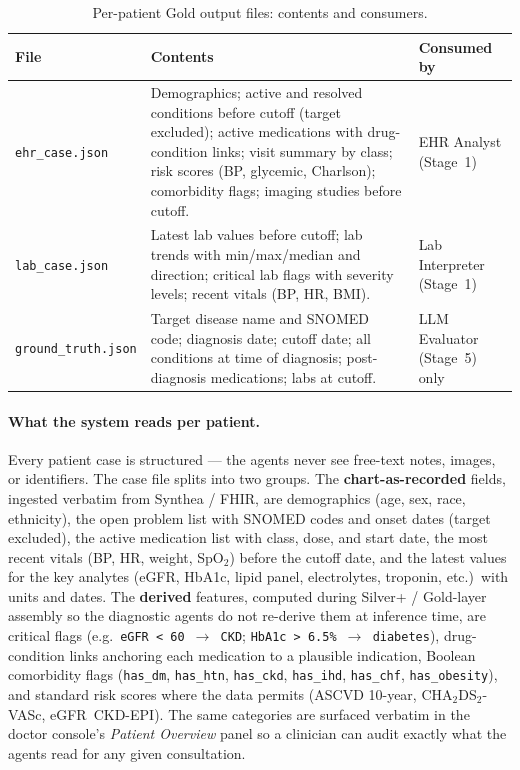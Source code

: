 \begin{table}[!htbp]
\centering
\caption{Per-patient Gold output files: contents and consumers.}
\label{tab:gold_files}
\footnotesize
\begin{tabular}{@{}p{32mm}p{72mm}p{32mm}@{}}
\toprule
\textbf{File} & \textbf{Contents} & \textbf{Consumed by} \\
\midrule
\texttt{ehr\_case.json} &
Demographics; active and resolved conditions before cutoff (target
excluded); active medications with drug-condition links; visit
summary by class; risk scores (BP, glycemic, Charlson); comorbidity
flags; imaging studies before cutoff. &
EHR Analyst (Stage~1) \\

\texttt{lab\_case.json} &
Latest lab values before cutoff; lab trends with min/max/median and
direction; critical lab flags with severity levels; recent vitals
(BP, HR, BMI). &
Lab Interpreter (Stage~1) \\

\texttt{ground\_truth.json} &
Target disease name and SNOMED code; diagnosis date; cutoff date;
all conditions at time of diagnosis; post-diagnosis medications;
labs at cutoff. &
LLM Evaluator (Stage~5) only \\
\bottomrule
\end{tabular}
\end{table}

\FloatBarrier

\paragraph{What the system reads per patient.}
Every patient case is structured --- the agents never see free-text
notes, images, or identifiers. The case file splits into two groups.
The \textbf{chart-as-recorded} fields, ingested verbatim from Synthea
/ FHIR, are demographics (age, sex, race, ethnicity), the open problem
list with SNOMED codes and onset dates (target excluded), the active
medication list with class, dose, and start date, the most recent
vitals (BP, HR, weight, SpO$_2$) before the cutoff date, and the
latest values for the key analytes (eGFR, HbA1c, lipid panel,
electrolytes, troponin, etc.)\ with units and dates. The
\textbf{derived} features, computed during Silver+ / Gold-layer
assembly so the diagnostic agents do not re-derive them at inference
time, are critical flags (e.g.\ \texttt{eGFR < 60 $\to$ CKD};
\texttt{HbA1c > 6.5\% $\to$ diabetes}), drug-condition links anchoring
each medication to a plausible indication, Boolean comorbidity flags
(\texttt{has\_dm}, \texttt{has\_htn}, \texttt{has\_ckd},
\texttt{has\_ihd}, \texttt{has\_chf}, \texttt{has\_obesity}), and
standard risk scores where the data permits (ASCVD 10-year,
CHA$_2$DS$_2$-VASc, eGFR~CKD-EPI). The same categories are surfaced
verbatim in the doctor console's \emph{Patient Overview} panel so a
clinician can audit exactly what the agents read for any given
consultation.


